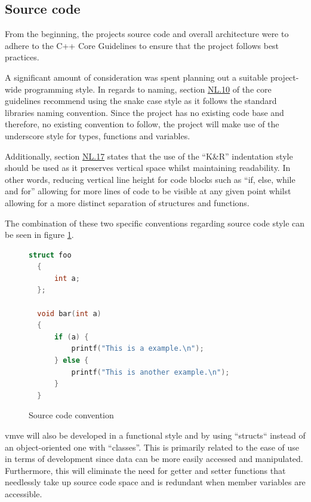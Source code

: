 \documentclass[11pt]{article}
\begin{document}
\subsection{Source code}
From the beginning, the projects source code and overall architecture were to
adhere to the C++ Core Guidelines \cite{cpp-guidelines} to ensure that the
project follows best practices.

A significant amount of consideration was spent planning out a suitable
project-wide programming style. In regards to naming, section
\href{http://isocpp.github.io/CppCoreGuidelines/CppCoreGuidelines#nl10-prefer-underscore_style-names}{NL.10}
of the core guidelines recommend using the snake case style as it follows the
standard libraries naming convention. Since the project has no existing code
base and therefore, no existing convention to follow, the project will make use
of the underscore style for types, functions and variables. 

Additionally, section
\href{https://isocpp.github.io/CppCoreGuidelines/CppCoreGuidelines#nl17-use-kr-derived-layout}{NL.17}
states that the use of the ``K\&R''  indentation style \cite{indentation} should
be used as it preserves vertical space whilst maintaining readability. In other
words, reducing vertical line height for code blocks such as ``if, else, while
and for'' allowing for more lines of code to be visible at any given point
whilst allowing for a more distinct separation of structures and functions.

The combination of these two specific conventions regarding source code style
can be seen in figure \ref{fig:convention}.

\begin{figure}[H]
\centering
\begin{lstlisting}[language=C++]
  struct foo
  {
      int a;
  };

  void bar(int a)
  {
      if (a) {
          printf("This is a example.\n");
      } else {
          printf("This is another example.\n");
      }
  }
\end{lstlisting}
\caption{Source code convention}
\label{fig:convention}
\end{figure}

\gls*{vmve} will also be developed in a functional style and by using ``structs``
instead of an object-oriented one with ``classes''. This is primarily related to
the ease of use in terms of development since data can be more easily accessed
and manipulated. Furthermore, this will eliminate the need for getter and setter
functions that needlessly take up source code space and is redundant when member
variables are accessible.
\end{document}
